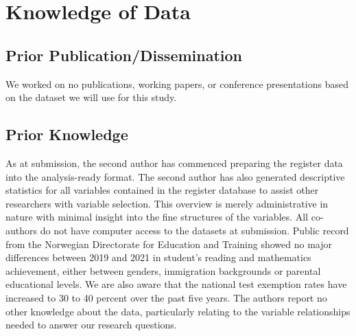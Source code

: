 \section{Knowledge of Data}

\subsection{Prior Publication/Dissemination}
We worked on no publications, working papers, or conference presentations based on the dataset we will use for this study.

\subsection{Prior Knowledge}
As at submission, the second author has commenced preparing the register data into the analysis-ready format. The second author has also generated descriptive statistics for all variables contained in the register database to assist other researchers with variable selection. This overview is merely administrative in nature with minimal insight into the fine structures of the variables. All co-authors do not have computer access to the datasets at submission. Public record from the Norwegian Directorate for Education and Training showed no major differences between 2019 and 2021 in student's reading and mathematics achievement, either between genders, immigration backgrounds or parental educational levels. We are also aware that the national test exemption rates have increased to 30 to 40 percent over the past five years. The authors report no other knowledge about the data, particularly relating to the variable relationships needed to answer our research questions.
